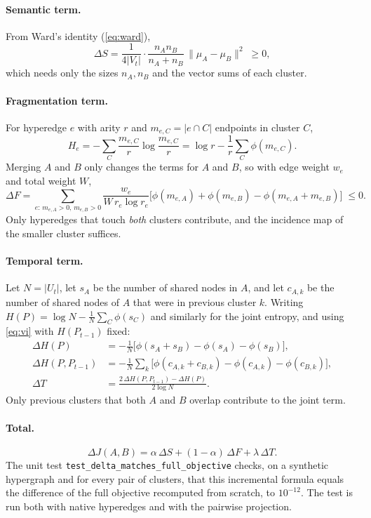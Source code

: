 \documentclass[11pt,a4paper]{article}
\newcommand{\cref}[1]{\autoref{#1}}
\theoremstyle{remark}
\newcommand{\code}[1]{\texttt{\small #1}}
\begin{document}
\paragraph{Semantic term.} From Ward's identity (\cref{eq:ward}),
\begin{equation}
\Delta S=\frac{1}{4|V_t|}\cdot\frac{n_An_B}{n_A+n_B}\,\|\mu_A-\mu_B\|^2\;\ge 0,
\end{equation}
which needs only the sizes $n_A,n_B$ and the vector sums of each cluster.

\paragraph{Fragmentation term.}
For hyperedge $e$ with arity $r$ and $m_{e,C}=|e\cap C|$ endpoints in cluster $C$,
\[
H_e=-\sum_C\frac{m_{e,C}}{r}\log\frac{m_{e,C}}{r}=\log r-\frac1r\sum_C\phi(m_{e,C}).
\]
Merging $A$ and $B$ only changes the terms for $A$ and $B$, so with edge weight $w_e$
and total weight $W$,
\begin{equation}
\Delta F=\sum_{e:\,m_{e,A}>0,\,m_{e,B}>0}\frac{w_e}{W\,r_e\log r_e}\Big[\phi(m_{e,A})+\phi(m_{e,B})-\phi(m_{e,A}+m_{e,B})\Big]\;\le 0 .
\label{eq:dF}
\end{equation}
Only hyperedges that touch \emph{both} clusters contribute, and the incidence map of the
smaller cluster suffices.

\paragraph{Temporal term.}
Let $N=|U_t|$, let $s_A$ be the number of shared nodes in $A$, and let $c_{A,k}$ be
the number of shared nodes of $A$ that were in previous cluster $k$. Writing
$H(P)=\log N-\frac1N\sum_C\phi(s_C)$ and similarly for the joint entropy, and using
\cref{eq:vi} with $H(P_{t-1})$ fixed:
\begin{align}
\Delta H(P)&=-\tfrac1N\big[\phi(s_A+s_B)-\phi(s_A)-\phi(s_B)\big],\\
\Delta H(P,P_{t-1})&=-\tfrac1N\sum_k\big[\phi(c_{A,k}+c_{B,k})-\phi(c_{A,k})-\phi(c_{B,k})\big],\\
\Delta T&=\frac{2\,\Delta H(P,P_{t-1})-\Delta H(P)}{2\log N}.
\end{align}
Only previous clusters that both $A$ and $B$ overlap contribute to the joint term.

\paragraph{Total.}
\[\Delta J(A,B)=\alpha\,\Delta S+(1-\alpha)\,\Delta F+\lambda\,\Delta T.\]
The unit test \code{test\_delta\_matches\_full\_objective} checks, on a synthetic
hypergraph and for every pair of clusters, that this incremental formula equals the
difference of the full objective recomputed from scratch, to $10^{-12}$. The test is run
both with native hyperedges and with the pairwise projection.
\end{document}

